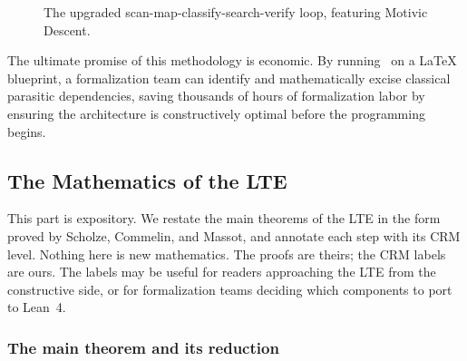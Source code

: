 \begin{figure}[h]
\centering
{}
\caption{The upgraded scan-map-classify-search-verify loop, featuring Motivic Descent.}
\label{fig:loop}
\end{figure}

The ultimate promise of this methodology is economic. By running \CRMlint\ on a LaTeX blueprint, a formalization team can identify and mathematically excise classical parasitic dependencies, saving thousands of hours of formalization labor by ensuring the architecture is constructively optimal before the programming begins.


\subsection{The Mathematics of the LTE}\label{part:math}

This part is expository.  We restate the main theorems of the LTE
in the form proved by Scholze, Commelin, and Massot, and annotate
each step with its CRM level.  Nothing here is new mathematics.
The proofs are theirs; the CRM labels are ours.  The labels may
be useful for readers approaching the LTE from the constructive
side, or for formalization teams deciding which components to
port to Lean~4.

\subsubsection{The main theorem and its reduction}\label{sec:main-thm}

